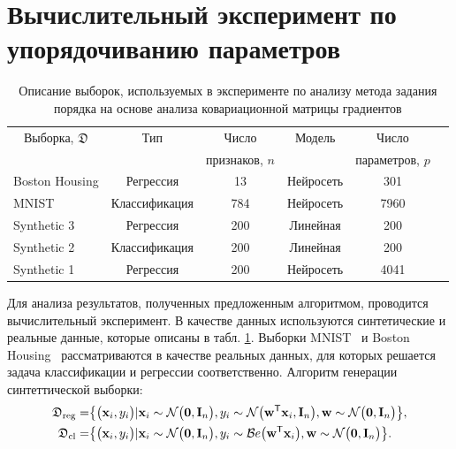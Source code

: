 \section{Вычислительный эксперимент по упорядочиванию параметров}

\begin{table}[h!t]
\begin{center}
\caption{Описание выборок, используемых в эксперименте по анализу метода задания порядка на основе анализа ковариационной матрицы градиентов}
\label{tb:ex:1}
\begin{tabular}{|c|c|c|c|c|c|}
\hline
	Выборка, $\mathfrak{D}$& Тип & Число& Модель& Число \\
	&& признаков, $n$&&параметров, $p$\\
	\hline
	\multicolumn{1}{|l|}{Boston Housing}&
	Регрессия& 13& Нейросеть& 301\\
	\hline
	\multicolumn{1}{|l|}{MNIST}&
	Классификация& 784& Нейросеть& 7960\\
	\hline
	\multicolumn{1}{|l|}{Synthetic 3}&
	Регрессия& 200& Линейная& 200\\
	\hline
	\multicolumn{1}{|l|}{Synthetic 2}&
	Классификация& 200& Линейная& 200\\
	\hline
	\multicolumn{1}{|l|}{Synthetic 1}&
	Регрессия& 200& Нейросеть& 4041\\
\hline

\end{tabular}
\end{center}
\end{table}

Для анализа результатов, полученных предложенным алгоритмом, проводится вычислительный эксперимент. В качестве данных используются синтетические и реальные данные, которые описаны в табл. \ref{tb:ex:1}. Выборки MNIST~\cite{mnist} и Boston Housing~\cite{Boston} рассматриваются в качестве реальных данных, для которых решается задача классификации и регрессии соответственно. Алгоритм генерации синтеттической выборки:
\[
\label{eq:ex:1}
\begin{aligned}
\mathfrak{D}_{\text{\text{reg}}} &= \bigr\{\bigr(\textbf{x}_i, y_i \bigr) |\textbf{x}_{i}\sim\mathcal{N}\bigr(\textbf{0}, \textbf{I}_{n}\bigr), y_{i}\sim\mathcal{N}\bigr(\textbf{w}^{\mathsf{T}}\textbf{x}_{i}, \textbf{I}_{n}\bigr),  \textbf{w} \sim \mathcal{N}\bigr(\textbf{0}, \textbf{I}_{n}\bigr)\bigr\},\\
\mathfrak{D}_{\text{\text{cl}}} &= \bigr\{\bigr(\textbf{x}_i, y_i \bigr) |\textbf{x}_{i}\sim\mathcal{N}\bigr(\textbf{0}, \textbf{I}_{n}\bigr), y_{i}\sim\mathcal{B}e\bigr(\textbf{w}^{\mathsf{T}}\textbf{x}_{i}\bigr),  \textbf{w} \sim \mathcal{N}\bigr(\textbf{0}, \textbf{I}_{n}\bigr)\bigr\}.
\end{aligned}
\]

